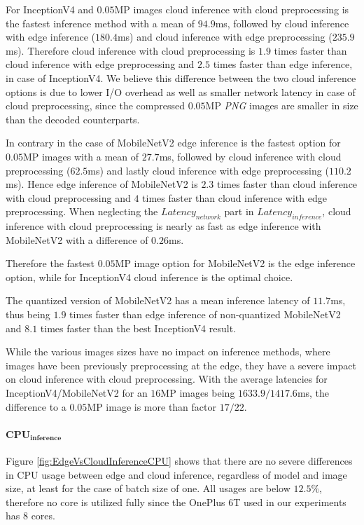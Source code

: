 For InceptionV4 and $0.05$MP images cloud inference with cloud preprocessing is the fastest inference method with a mean of $94.9$ms, followed by cloud inference with edge inference ($180.4$ms) and cloud inference with edge preprocessing ($235.9$ms).
Therefore cloud inference with cloud preprocessing is $1.9$ times faster than cloud inference with edge preprocessing and $2.5$ times faster than edge inference, in case of InceptionV4.
We believe this difference between the two cloud inference options is due to lower I/O overhead as well as smaller network latency in case of cloud preprocessing, since the compressed $0.05$MP \emph{PNG} images are smaller in size than the decoded counterparts. 

In contrary in the case of MobileNetV2 edge inference is the fastest option for $0.05$MP images with a mean of $27.7$ms, followed by cloud inference with cloud preprocessing ($62.5$ms) and lastly cloud inference with edge preprocessing ($110.2$ms).
Hence edge inference of MobileNetV2 is $2.3$ times faster than cloud inference with cloud preprocessing and $4$ times faster than cloud inference with edge preprocessing.
When neglecting the $Latency_{network}$ part in $Latency_{inference}$, cloud inference with cloud preprocessing is nearly as fast as edge inference with MobileNetV2 with a difference of $0.26$ms.

Therefore the fastest $0.05$MP image option for MobileNetV2 is the edge inference option, while for InceptionV4 cloud inference is the optimal choice.

The quantized version of MobileNetV2 has a mean inference latency of $11.7$ms, thus being $1.9$ times faster than edge inference of non-quantized MobileNetV2 and $8.1$ times faster than the best InceptionV4 result.

While the various images sizes have no impact on inference methods, where images have been previously preprocessing at the edge, they have a severe impact on cloud inference with cloud preprocessing.
With the average latencies for InceptionV4/MobileNetV2 for an $16$MP images being $1633.9/1417.6$ms, the difference to a $0.05$MP image is more than factor $17/22$.

\paragraph{$\mathbf{CPU_{inference}}$}
Figure \ref{fig:EdgeVsCloudInferenceCPU} shows that there are no severe differences in CPU usage between edge and cloud inference, regardless of model and image size, at least for the case of batch size of one.
All usages are below $12.5\%$, therefore no core is utilized fully since the OnePlus 6T used in our experiments has $8$ cores.


